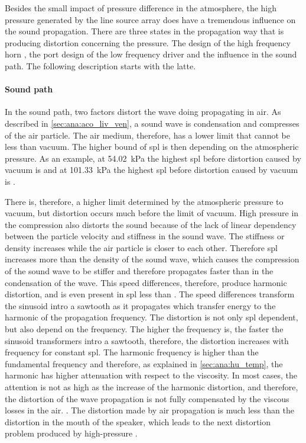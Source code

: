 Besides the small impact of pressure difference in the atmosphere, the high pressure generated by the line source array does have a tremendous influence on the sound propagation. There are three states in the propagation way that is producing distortion concerning the pressure. The design of the high frequency horn \citep{czerwinski1999air}, the port design of the low frequency driver \citep{vanderkooy1998nonlinearities} and the influence in the sound path. The following description starts with the latte.


\paragraph{Sound path} In the sound path, two factors distort the wave doing propagating in air. As described in \autoref{sec:ana:aco_liv_ven}, a sound wave is condensation and compresses of the air particle. The air medium, therefore, has a lower limit that cannot be less than vacuum. The higher bound of \gls{spl} is then depending on the atmospheric pressure. As an example, at \SI{54.02}{\kilo\pascal} the highest \gls{spl} before distortion caused by vacuum is  and at \SI{101.33}{\kilo\pascal} the highest \gls{spl} before distortion caused by vacuum is . 

There is, therefore, a higher limit determined by the atmospheric pressure to vacuum,  but distortion occurs much before the limit of vacuum.  High pressure in the compression also distorts the sound because of the lack of linear dependency between the particle velocity and stiffness in the sound wave. The stiffness or density increases while the air particle is closer to each other. Therefore \gls{spl} increases more than the density of the sound wave, which causes the compression of the sound wave to be stiffer and therefore propagates faster than in the condensation of the wave. This speed differences, therefore, produce harmonic distortion, and is even present in \gls{spl} less than  \citep{czerwinski1999air}. The speed differences transform the sinusoid intro a sawtooth as it propagates which transfer energy to the harmonic of the propagation frequency. The distortion is not only \gls{spl} dependent, but also depend on the frequency. The higher the frequency is, the faster the sinusoid transformers intro a sawtooth, therefore, the distortion increases with frequency for constant \gls{spl}. The harmonic frequency is higher than the fundamental frequency and therefore, as explained in \autoref{sec:ana:hu_temp}, the harmonic has higher attenuation with respect to the viscosity. In most cases, the attention is not as high as the increase of the harmonic distortion, and therefore, the distortion of the wave propagation is not fully compensated by the viscous losses in the air. \citep{czerwinski1999air}. 
The distortion made by air propagation is much less than the distortion in the mouth of the speaker, which leads to the next distortion problem produced by high-pressure \citep{czerwinski1999air}.

